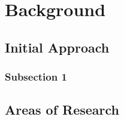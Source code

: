 
\chapter{Background} %

\label{Chapter2} %



\section{Initial Approach}



\subsection{Subsection 1}



\section{Areas of Research}
